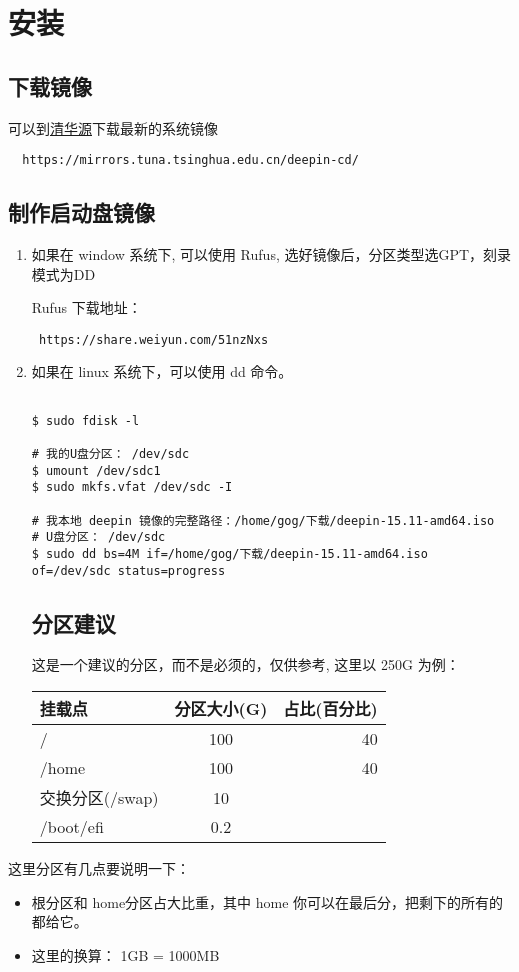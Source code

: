 \setcounter{page}{1} %
\chapter{安装}
\section{下载镜像}
可以到\href{https://mirrors.tuna.tsinghua.edu.cn/deepin-cd/}{清华源}下载最新的系统镜像

\begin{verbatim}
  https://mirrors.tuna.tsinghua.edu.cn/deepin-cd/
\end{verbatim}
  
\section{制作启动盘镜像}
\flushleft
\begin{enumerate}
\item 如果在 window 系统下, 可以使用 Rufus, 选好镜像后，分区类型选GPT，刻录模式为DD

Rufus 下载地址：\\
\begin{lstlisting}
 https://share.weiyun.com/51nzNxs
\end{lstlisting}
\item 如果在 linux 系统下，可以使用 dd 命令。
\begin{lstlisting}

$ sudo fdisk -l 

# 我的U盘分区： /dev/sdc
$ umount /dev/sdc1
$ sudo mkfs.vfat /dev/sdc -I

# 我本地 deepin 镜像的完整路径：/home/gog/下载/deepin-15.11-amd64.iso 
# U盘分区： /dev/sdc
$ sudo dd bs=4M if=/home/gog/下载/deepin-15.11-amd64.iso of=/dev/sdc status=progress
\end{lstlisting}

\section{分区建议}
这是一个建议的分区，而不是必须的，仅供参考, 这里以 250G 为例：


\begin{tabular}{|l|c|r|}
\hline
 挂载点 & 分区大小(G) & 占比(百分比)\\
\hline
   / & 100 & 40 \\      
\hline
   /home & 100 & 40 \\      
\hline
  交换分区(/swap) & 10 & \\
\hline
  /boot/efi & 0.2 & \\
\hline

\end{tabular}
\end{enumerate}


\setlength\parindent{2em}这里分区有几点要说明一下：

\begin{itemize}
\item 根分区和 home分区占大比重，其中 home 你可以在最后分，把剩下的所有的都给它。
\item 这里的换算： 1GB = 1000MB  
\end{itemize}